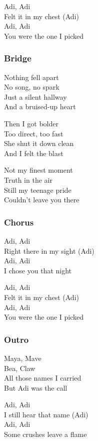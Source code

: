 Adi, Adi\\
Felt it in my chest (Adi)\\
Adi, Adi\\
You were the one I picked

\subsubsection{Bridge}\label{bridge-19}

Nothing fell apart\\
No song, no spark\\
Just a silent hallway\\
And a bruised-up heart

Then I got bolder\\
Too direct, too fast\\
She shut it down clean\\
And I felt the blast

Not my finest moment\\
Truth in the air\\
Still my teenage pride\\
Couldn't leave you there

\subsubsection{Chorus}\label{chorus-52}

Adi, Adi\\
Right there in my sight (Adi)\\
Adi, Adi\\
I chose you that night

Adi, Adi\\
Felt it in my chest (Adi)\\
Adi, Adi\\
You were the one I picked

\subsubsection{Outro}\label{outro-6}

Maya, Mave\\
Bea, Claw\\
All those names I carried\\
But Adi was the call

Adi, Adi\\
I still hear that name (Adi)\\
Adi, Adi\\
Some crushes leave a flame

